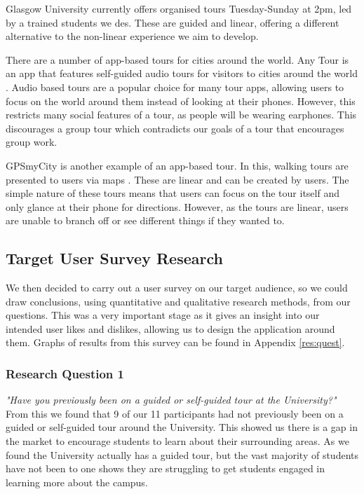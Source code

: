 \documentclass[a4,10pt,twocolumn]{article}
\begin{document}
Glasgow University currently offers organised tours Tuesday-Sunday at 2pm, led by a trained students \cite{guidedtour}we des. These are guided and linear, offering a different alternative to the non-linear experience we aim to develop.

There are a number of app-based tours for cities around the world. Any Tour is an app that features self-guided audio tours for visitors to cities around the world \cite{wehostanytour}. Audio based tours are a popular choice for many tour apps, allowing users to focus on the world around them instead of looking at their phones. However, this restricts many social features of a tour, as people will be wearing earphones. This discourages a group tour which contradicts our goals of a tour that encourages group work.

GPSmyCity is another example of an app-based tour. In this, walking tours are presented to users via maps \cite{gpsmycity}. These are linear and can be created by users. The simple nature of these tours means that users can focus on the tour itself and only glance at their phone for directions. However, as the tours are linear, users are unable to branch off or see different things if they wanted to. 

\subsection{Target User Survey Research}
We then decided to carry out a user survey on our target audience, so we could draw conclusions, using quantitative and qualitative research methods, from our questions. This was a very important stage as it gives an insight into our intended user likes and dislikes, allowing us to design the application around them. Graphs of results from this survey can be found in Appendix \ref{res:quest}.

\subsubsection{Research Question 1}
\noindent\emph{"Have you previously been on a guided or self-guided tour at the University?"}
\newline
\newline
 From this we found that 9 of our 11 participants had not previously been on a guided or self-guided tour around the University. This showed us there is a gap in the market to encourage students to learn about their surrounding areas. As we found the University actually has a guided tour, but the vast majority of students have not been to one shows they are struggling to get students engaged in learning more about the campus.
\end{document}
